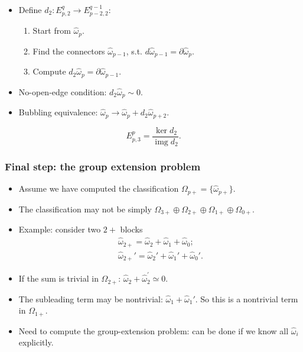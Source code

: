 \documentclass[xcolor=table, 10pt, aspectratio=43]{beamer}
\DeclareMathOperator{\img}{img}
\begin{document}
\begin{frame}
\begin{center}
\begin{animateinline}{5}
{
}
\end{animateinline}
\end{center}
\begin{itemize}
\item Define $d_2:E^q_{p,2}\rightarrow E^{q-1}_{p-2,2}$:
\begin{enumerate}
\item Start from $\hat\omega_p$.
\item Find the connectors $\hat\omega_{p-1}$, s.t. $d\hat\omega_{p-1}=\partial\hat\omega_p$.
\item Compute $d_2\hat\omega_p=\partial\hat\omega_{p-1}$.
\end{enumerate}
\item No-open-edge condition: $d_2\hat\omega_p\sim0$.
\item Bubbling equivalence: $\hat\omega_p\rightarrow\hat\omega_p+d_2\hat\omega_{p+2}$.
\end{itemize}
\[E^p_{p,3}=\frac{\ker d_2}{\img d_2}.\]
\end{frame}

\begin{frame}
\frametitle{Final step: the group extension problem}
\begin{itemize}
\item Assume we have computed the classification $\Omega_{p+}=\{\hat\omega_{p+}\}$.
\item The classification may not be simply $\Omega_{3+}\oplus\Omega_{2+}\oplus \Omega_{1+} \oplus \Omega_{0+} $.
\item Example: consider two $2+$ blocks
\begin{align*}
\hat\omega_{2+}=\hat\omega_2+\hat\omega_1+\hat\omega_0;\\
\hat\omega_{2+}'=\hat\omega_2'+\hat\omega_1'+\hat\omega_0'.
\end{align*}
\item If the sum is trivial in $\Omega_{2+}$: $\hat\omega_2+\hat\omega_2^\prime\simeq0$.
\item The subleading term may be nontrivial: $\hat\omega_1+\hat\omega_1'$. So this is a nontrivial term in $\Omega_{1+}$.
\item Need to compute the group-extension problem: can be done if we know all $\hat\omega_i$ explicitly.
\end{itemize}
\end{frame}
\end{document}
